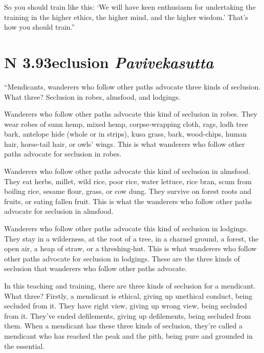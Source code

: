 \documentclass[12pt,openany]{book}%
\newcommand*{\suttatitleacronym}[1]{\smaller[2]{#1}\vspace*{.3em}}
\newcommand*{\suttatitletranslation}[1]{\linebreak{#1}}
\newcommand*{\suttatitleroot}[1]{\linebreak\smaller[2]\itshape{#1}}
\newcommand*{\tocacronym}[1]{\hspace*{-3.3em}{#1}\quad}
\newcommand*{\toctranslation}[1]{#1}
\newcommand*{\tocroot}[1]{(\textit{#1})}
\begin{document}
So you should train like this: ‘We will have keen enthusiasm for undertaking the training in the higher ethics, the higher mind, and the higher wisdom.’ That’s how you should train.” 

%
\section*{{\suttatitleacronym AN 3.93}{\suttatitletranslation Seclusion }{\suttatitleroot Pavivekasutta}}
\addcontentsline{toc}{section}{\tocacronym{AN 3.93} \toctranslation{Seclusion } \tocroot{Pavivekasutta}}

“Mendicants, wanderers who follow other paths advocate three kinds of seclusion. What three? Seclusion in robes, almsfood, and lodgings. 

Wanderers who follow other paths advocate this kind of seclusion in robes. They wear robes of sunn hemp, mixed hemp, corpse-wrapping cloth, rags, lodh tree bark, antelope hide (whole or in strips), kusa grass, bark, wood-chips, human hair, horse-tail hair, or owls’ wings. This is what wanderers who follow other paths advocate for seclusion in robes. 

Wanderers who follow other paths advocate this kind of seclusion in almsfood. They eat herbs, millet, wild rice, poor rice, water lettuce, rice bran, scum from boiling rice, sesame flour, grass, or cow dung. They survive on forest roots and fruits, or eating fallen fruit. This is what the wanderers who follow other paths advocate for seclusion in almsfood. 

Wanderers who follow other paths advocate this kind of seclusion in lodgings. They stay in a wilderness, at the root of a tree, in a charnel ground, a forest, the open air, a heap of straw, or a threshing-hut. This is what wanderers who follow other paths advocate for seclusion in lodgings. These are the three kinds of seclusion that wanderers who follow other paths advocate. 

In this teaching and training, there are three kinds of seclusion for a mendicant. What three? Firstly, a mendicant is ethical, giving up unethical conduct, being secluded from it. They have right view, giving up wrong view, being secluded from it. They’ve ended defilements, giving up defilements, being secluded from them. When a mendicant has these three kinds of seclusion, they’re called a mendicant who has reached the peak and the pith, being pure and grounded in the essential. 
\end{document}
